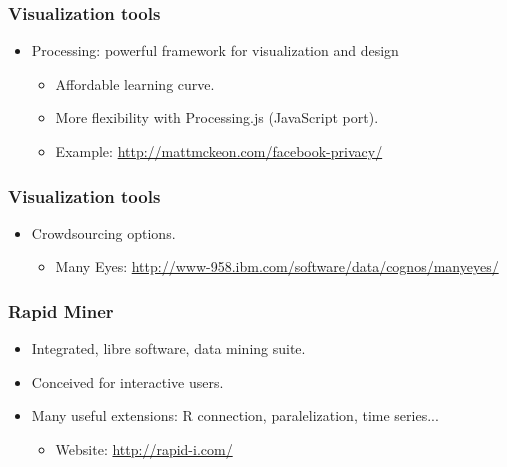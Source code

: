 
\begin{frame}
\frametitle{Visualization tools}

\begin{itemize}
 \item Processing: powerful framework for visualization and design
 \begin{itemize}
  \item Affordable learning curve.
  \item More flexibility with Processing.js (JavaScript port).
  \item Example: \url{http://mattmckeon.com/facebook-privacy/}
 \end{itemize}

\end{itemize}

\end{frame}


\begin{frame}
\frametitle{Visualization tools}

\begin{itemize}
 \item Crowdsourcing options.
 \begin{itemize}
  \item Many Eyes: \url{http://www-958.ibm.com/software/data/cognos/manyeyes/}
 \end{itemize}

\end{itemize}

\end{frame}


\begin{frame}
\frametitle{Rapid Miner}

\begin{itemize}
 \item Integrated, libre software, data mining suite.
 \item Conceived for interactive users.
 \item Many useful extensions: R connection, paralelization, time series...
 \begin{itemize}
  \item Website: \url{http://rapid-i.com/}
 \end{itemize}

\end{itemize}

\end{frame}

